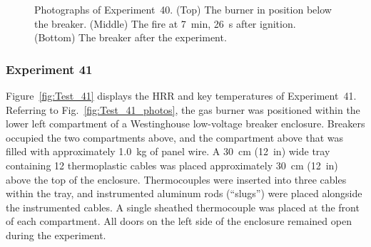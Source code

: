 \begin{figure}[p]
\caption[Photographs of Experiment~40]{Photographs of Experiment~40. (Top) The burner in position below the breaker. (Middle) The fire at 7~min, 26~s after ignition. (Bottom) The breaker after the experiment.}
\label{fig:Test_40_photos}
\end{figure}


\clearpage

\subsubsection{Experiment 41}

Figure~\ref{fig:Test_41} displays the HRR and key temperatures of Experiment~41. Referring to Fig.~\ref{fig:Test_41_photos}, the gas burner was positioned within the lower left compartment of a Westinghouse low-voltage breaker enclosure. Breakers occupied the two compartments above, and the compartment above that was filled with approximately 1.0~kg of panel wire. A 30~cm (12~in) wide tray containing 12 thermoplastic cables was placed approximately 30~cm (12~in) above the top of the enclosure. Thermocouples were inserted into three cables within the tray, and instrumented aluminum rods (``slugs'') were placed alongside the instrumented cables. A single sheathed thermocouple was placed at the front of each compartment. All doors on the left side of the enclosure remained open during the experiment.

